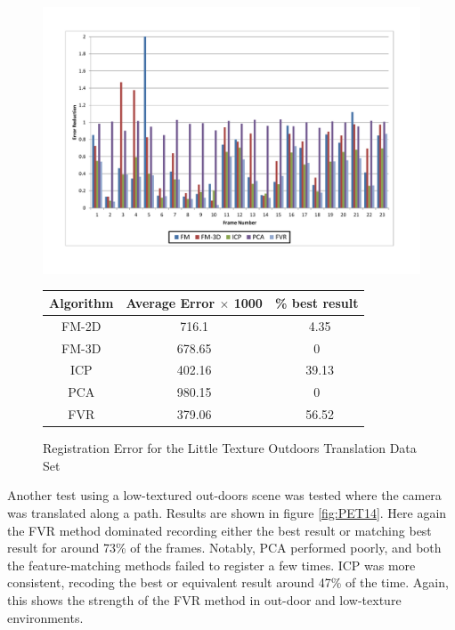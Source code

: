 \begin{figure}
\centering
\includegraphics[width=6in]{images/results/Outside_No_Texture_Translation}
\caption{Registration Error for the Little Texture Outdoors Translation Data Set}
\label{fig:PET14}

\begin{tabular}{ccc}
\hline
\textbf{Algorithm} & \textbf{Average Error $\times$ 1000} & \textbf{\% best result}\\ \hline
FM-2D	& 716.1 & ~4.35\\
FM-3D	& 678.65 & 0\\
ICP		& 402.16 & ~39.13\\
PCA		& 980.15 & 0\\
FVR		& 379.06 & ~56.52\\
\end{tabular}
\label{tab:PET14ST}
\end{figure} 

Another test using a low-textured out-doors scene was tested where the camera was translated along a path. Results are shown in figure \ref{fig:PET14}. Here again the FVR method dominated recording either the best result or matching best result for around 73\% of the frames. Notably, PCA performed poorly, and both the feature-matching methods failed to register a few times. ICP was more consistent, recoding the best or equivalent result around 47\% of the time. Again, this shows the strength of the FVR method in out-door and low-texture environments. 


